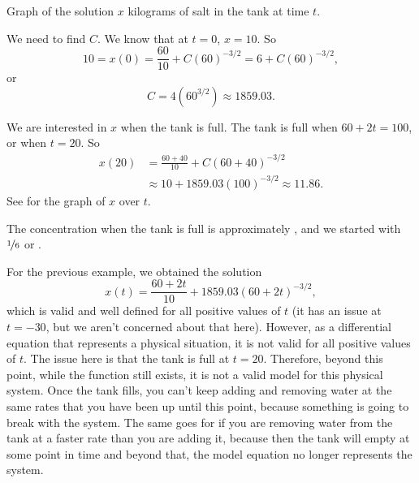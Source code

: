\documentclass{ximera}
\begin{document}
\begin{exampleSol}
    \begin{mywrapfig}{3.25in}
        \capstart
        \caption{Graph of the solution $x$ kilograms of salt in the tank at time $t$.\label{linear-salt-graph:fig}}
    \end{mywrapfig}
    We need to find $C$.  We know that at $t=0$, $x=10$.  So
    \begin{equation*}
        10 = x(0) = \frac{60}{10} +C{(60)}^{-3/2} = 6 +C{(60)}^{-3/2} ,
    \end{equation*}
    or
    \begin{equation*}
        C=4 ({60}^{3/2}) \approx 1859.03 .
    \end{equation*}
    
    We are interested in $x$ when the tank is full.  The tank is full when $60+2t = 100$, or when $t=20$.  So
    \begin{equation*}
        \begin{split}
            x(20) & = \frac{60+40}{10}+C{(60+40)}^{-3/2} \\
            & \approx 10+1859.03 {(100)}^{-3/2}\approx11.86 .
        \end{split}
    \end{equation*}
    See  for the graph of $x$ over $t$.
    
    The concentration when the tank is full is approximately , and we started with $\nicefrac{1}{6}$ or .
\end{exampleSol}

For the previous example, we obtained the solution 
\begin{equation*}
    x(t) = \frac{60 + 2t}{10} + 1859.03(60+2t)^{-3/2},
\end{equation*}
which is valid and well defined for all positive values of $t$ (it has an issue at $t=-30$, but we aren't concerned about that here). However, as a differential equation that represents a physical situation, it is not valid for all positive values of $t$. The issue here is that the tank is full at $t=20$. Therefore, beyond this point, while the function still exists, it is not a valid model for this physical system. Once the tank fills, you can't keep adding and removing water at the same rates that you have been up until this point, because something is going to break with the system. The same goes for if you are removing water from the tank at a faster rate than you are adding it, because then the tank will empty at some point in time and beyond that, the model equation no longer represents the system.  
\end{document}
